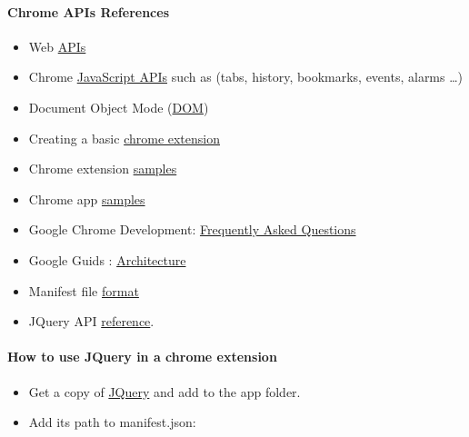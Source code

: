 \paragraph{Chrome APIs References}
\begin{itemize}
	\item Web \href{https://developer.chrome.com/extensions/api_other}{APIs}
	\item Chrome \href{https://developer.chrome.com/extensions/api_index}{JavaScript APIs} such as (tabs, history, bookmarks, events, alarms \dots)
	\item Document Object Mode (\href{https://developer.mozilla.org/en-US/docs/Web/API/Document_Object_Model}{DOM})
	\item Creating a basic \href{http://talks.codegram.com/creating-basic-chrome-extensions}{chrome extension}
	\item Chrome extension \href{https://developer.chrome.com/extensions/samples}{samples}
	\item Chrome app \href{https://github.com/GoogleChrome/chrome-app-samples}{samples}
	\item Google Chrome Development: \href{https://developer.chrome.com/extensions/faq}{Frequently Asked Questions}
	\item Google Guids : \href{https://developer.chrome.com/extensions/overview#arch}{Architecture}
	\item Manifest file \href{https://developer.chrome.com/extensions/manifest}{format}
	\item JQuery API \href{http://api.jquery.com/category/selectors/}{reference}.
\end{itemize}
\newpage
\paragraph{How to use JQuery in a chrome extension \cite{carl-jquery}}
\begin{itemize}
	\item Get a copy of \href{http://jquery.com/download/}{JQuery} and add  to the app folder.
	\item Add its path to manifest.json:\newline
\end{itemize}

